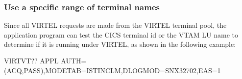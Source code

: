 \documentclass[letterpaper,10pt,english]{sphinxmanual}
\begin{document}


\subsubsection{Use a specific range of terminal names}
\label{\detokenize{User_Guide:use-a-specific-range-of-terminal-names}}
Since all VIRTEL requests are made from the VIRTEL terminal pool, the application program can test the CICS terminal
id or the VTAM LU name to determine if it is running under VIRTEL, as shown in the following example:

\begin{sphinxVerbatim}[commandchars=\\\{\}]
 
\end{sphinxVerbatim}


\begin{sphinxVerbatim}[commandchars=\\\{\}]
VIRTVT?? APPL AUTH=(ACQ,PASS),MODETAB=ISTINCLM,DLOGMOD=SNX32702,EAS=1
\end{sphinxVerbatim}

\end{document}
